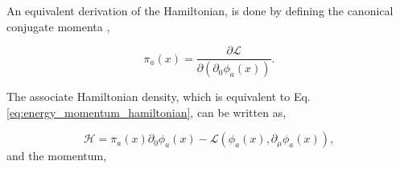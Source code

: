 \documentclass[11pt,a4paper,twoside,pdf]{article}
\numberwithin{equation}{section}
\begin{document}

An equivalent derivation of the Hamiltonian, is done by
defining the canonical conjugate momenta \cite{Peskin:1995ev},

\begin{equation}
    \pi_a (x) = \frac{\partial \mathcal{L}}{\partial (\partial_0 \phi_a (x))}.
\end{equation}

The associate Hamiltonian density, which is equivalent to Eq.\eqref{eq:energy_momentum_hamiltonian},
can be written as,

\begin{equation}
    \mathcal{H} = \pi_a (x) \partial_0 \phi_a (x) - \mathcal{L}(\phi_a (x),\partial_\mu\phi_a (x)),
\end{equation}
and the momentum, 
\end{document}
